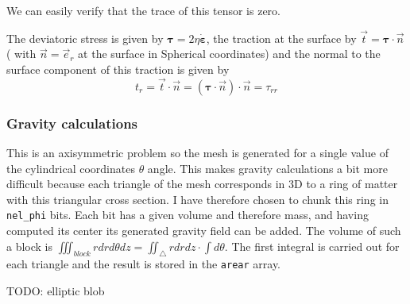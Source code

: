 We can easily verify that the trace of this tensor is zero.

The deviatoric stress is given by 
${\bm \tau}=2\eta \dot{\bm \varepsilon}$,
the traction at the surface  by 
$\vec{t}={\bm \tau}\cdot \vec{n}$ (
with $\vec{n}=\vec{e}_r$ at the surface in Spherical coordinates) and the normal to the surface component of this traction 
is given by
\[
t_r = \vec{t}\cdot \vec{n} = ({\bm \tau}\cdot \vec{n})\cdot \vec{n} = \tau_{rr}
\]




 
\subsubsection*{Gravity calculations}

This is an axisymmetric problem so the mesh is generated for a single value of the cylindrical 
coordinates $\theta$ angle. 
This makes gravity calculations a bit more difficult because each triangle of the mesh corresponds
in 3D to a ring of matter with this triangular cross section. 
I have therefore chosen to chunk this ring in {\tt nel\_phi} bits. Each bit has a given volume and therefore
mass, and having computed its center its generated gravity field can be added. 
The volume of such a block is $\iiint_{block} r dr d\theta dz =\iint_\triangle rdrdz \cdot \int d\theta$.  
The first integral is carried out for each triangle and the result is stored in the {\tt arear} array. 







TODO: elliptic blob

